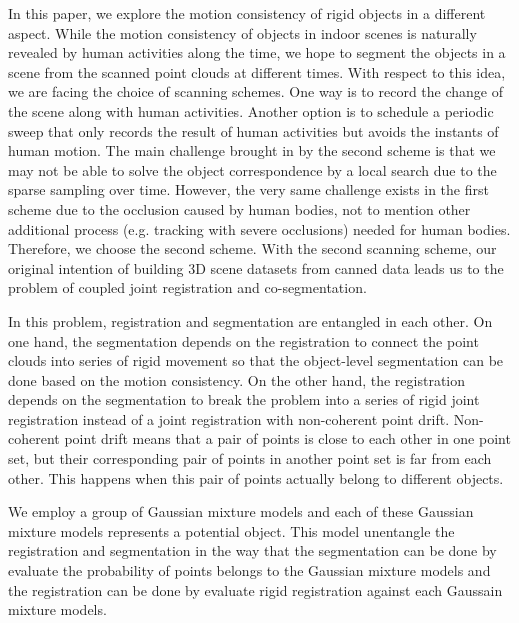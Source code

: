 In this paper, we explore the motion consistency of rigid objects in a different aspect.
%
While the motion consistency of objects in indoor scenes is naturally revealed by human activities along the time, we hope to segment the objects in a scene from the scanned point clouds at different times. 
%
With respect to this idea, we are facing the choice of scanning schemes. 
%
One way is to record the change of the scene along with human activities.
Another option is to schedule a periodic sweep that only records the result of human activities but avoids the instants of human motion. 
%
The main challenge brought in by the second scheme is that we may not be able to solve the object correspondence by a local search due to the sparse sampling over time.
However, the very same challenge exists in the first scheme due to the occlusion caused by human bodies, not to mention other additional process (e.g. tracking with severe occlusions) needed for human bodies.
%
Therefore, we choose the second scheme.
 
%
With the second scanning scheme, our original intention of building 3D scene datasets from canned data leads us to the problem of coupled joint registration and co-segmentation.


In this problem, registration and segmentation are entangled in each other. 
%
On one hand, the segmentation depends on the registration to connect the point clouds into series of rigid movement so that the object-level segmentation can be done based on the motion consistency. On the other hand, the registration depends on the segmentation to break the problem into a series of rigid joint registration instead of a joint registration with non-coherent point drift.
Non-coherent point drift means that a pair of points is close to each other in one point set, but their corresponding pair of points in another point set is far from each other. 
%
This happens when this pair of points actually belong to different objects.


We employ a group of Gaussian mixture models and each of these Gaussian mixture models represents a potential object. 
This model unentangle   the registration and segmentation in the way that the segmentation can be done by evaluate the probability of points belongs to the Gaussian mixture models and the registration can be done by evaluate rigid registration against each Gaussain mixture models.


